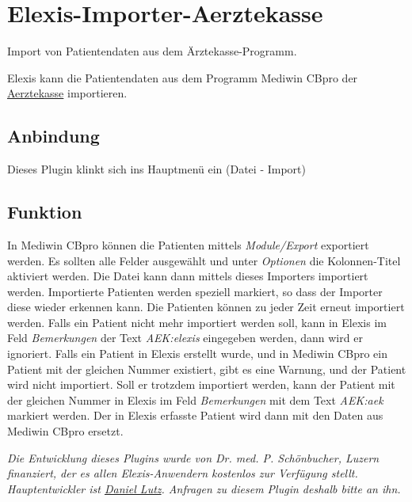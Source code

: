 \section{Elexis-Importer-Aerztekasse}
Import von Patientendaten aus dem Ärztekasse-Programm.

 Elexis kann die Patientendaten aus dem Programm Mediwin CBpro der  \href{http://www.aerztekasse.ch}{Aerztekasse} importieren.

\subsection{Anbindung}

Dieses Plugin klinkt sich ins Hauptmenü ein (Datei - Import)

\subsection{Funktion}

In Mediwin CBpro können die Patienten mittels \textit{Module/Export} exportiert werden. Es sollten alle Felder ausgewählt und unter \textit{Optionen} die Kolonnen-Titel aktiviert werden. Die Datei kann dann mittels dieses Importers importiert werden. Importierte Patienten werden speziell markiert, so dass der Importer diese wieder erkennen kann. Die Patienten können zu jeder Zeit erneut importiert werden. Falls ein Patient nicht mehr importiert werden soll, kann in Elexis im Feld  \textit{Bemerkungen}  der Text  \textit{AEK:elexis}  eingegeben werden, dann wird er ignoriert. Falls ein Patient in Elexis erstellt wurde, und in Mediwin CBpro ein Patient mit der gleichen Nummer existiert, gibt es eine Warnung, und der Patient wird nicht importiert. Soll er trotzdem importiert werden, kann der Patient mit der gleichen Nummer in Elexis im Feld  \textit{Bemerkungen}  mit dem Text  \textit{AEK:aek}  markiert werden. Der in Elexis erfasste Patient wird dann mit den Daten aus Mediwin CBpro ersetzt.

\textit{Die Entwicklung dieses Plugins wurde von Dr. med. P. Schönbucher, Luzern finanziert, der es allen Elexis-Anwendern kostenlos zur Verfügung stellt. Hauptentwickler ist \href{http://www.elexis.ch/jp/component/option,com_contact/task,view/contact_id,2/Itemid,32/}{Daniel Lutz}. Anfragen zu diesem Plugin deshalb bitte an ihn.} 